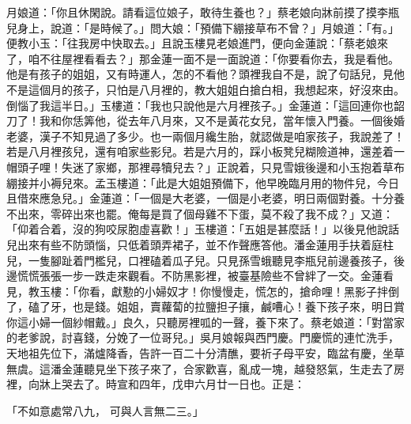 月娘道：「你且休閑說。請看這位娘子，敢待生養也？」蔡老娘向牀前摸了摸李瓶兒身上，說道：「是時候了。」問大娘：「預備下綳接草布不曾？」月娘道：「有。」便教小玉：「往我房中快取去。」且說玉樓見老娘進門，便向金蓮說：「蔡老娘來了，咱不往屋裡看看去？」那金蓮一面不是一面說道：「你要看你去，我是看他。他是有孩子的姐姐，又有時運人，怎的不看他？頭裡我自不是，說了句話兒，見他不是這個月的孩子，只怕是八月裡的，教大姐姐白搶白相，我想起來，好沒來由。倒惱了我這半日。」玉樓道：「我也只說他是六月裡孩子。」金蓮道：「這回連你也韶刀了！我和你恁筭他，從去年八月來，又不是黃花女兒，當年懷入門養。一個後婚老婆，漢子不知見過了多少。也一兩個月纔生胎，就認做是咱家孩子，我說差了！若是八月裡孩兒，還有咱家些影兒。若是六月的，踩小板凳兒糊險道神，還差着一帽頭子哩！失迷了家鄉，那裡尋犢兒去？」正說着，只見雪娥後邊和小玉抱着草布綳接并小褥兒來。孟玉樓道：「此是大姐姐預備下，他早晚臨月用的物件兒，今日且借來應急兒。」金蓮道：「一個是大老婆，一個是小老婆，明日兩個對養。十分養不出來，零碎出來也罷。俺每是買了個母雞不下蛋，莫不殺了我不成？」又道：「仰着合着，沒的狗咬尿胞虛喜歡！」玉樓道：「五姐是甚麼話！」以後見他說話兒出來有些不防頭惱，只低着頭弄裙子，並不作聲應答他。潘金蓮用手扶着庭柱兒，一隻腳趾着門檻兒，口裡磕着瓜子兒。只見孫雪蛾聽見李瓶兒前邊養孩子，後邊慌慌張張一步一跌走來觀看。不防黑影裡，被臺基險些不曾絆了一交。金蓮看見，教玉樓：「你看，獻懃的小婦奴才！你慢慢走，慌怎的，搶命哩！黑影子拌倒了，磕了牙，也是錢。姐姐，賣蘿蔔的拉鹽担子攘，鹹嘈心！養下孩子來，明日賞你這小婦一個紗帽戴。」良久，只聽房裡呱的一聲，養下來了。蔡老娘道：「對當家的老爹說，討喜錢，分娩了一位哥兒。」吳月娘報與西門慶。門慶慌的連忙洗手，天地祖先位下，滿爐降香，告許一百二十分清醮，要祈子母平安，臨盆有慶，坐草無虞。這潘金蓮聽見坐下孩子來了，合家歡喜，亂成一塊，越發怒氣，生走去了房裡，向牀上哭去了。時宣和四年，戊申六月廿一日也。正是：

「不如意處常八九，  可與人言無二三。」

